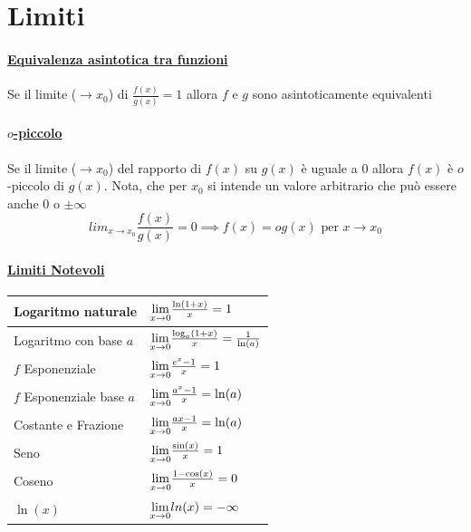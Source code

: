 \documentclass[12pt, a4paper]{article}
\begin{document}
\section*{Limiti}



\paragraph*{\underline{Equivalenza asintotica tra funzioni}} Se il limite ($\to x_0$) di $\frac{f(x)}{g(x)} = 1$ allora $f$ e $g$ sono asintoticamente equivalenti

\paragraph*{\underline{$o$-piccolo}} Se il limite ($\to x_0$) del rapporto di $f(x)$ su $g(x)$ è uguale a $0$ allora $f(x)$ è $o$-piccolo di $g(x)$.
Nota, che per $x_0$ si intende un valore arbitrario che può essere anche 0 o $\pm \infty$
$$lim_{x\to x_0} \frac{f(x)}{g(x)} = 0 \implies f(x) = o g(x)\text{ per } x\to x_0 $$

\paragraph*{\underline{Limiti Notevoli}}
\begin{tabularx}{0.8\textwidth}{ |X|X| }
	\hline
	Logaritmo naturale        & $\underset{x \to 0}{\lim} \frac{\ln(1+x)}{x} = 1 $                   \\
	\hline
	Logaritmo con base $a$    & $\underset{x \to 0}{\lim} \frac{\log_a(1+x)}{x} = \frac{1}{\ln(a)} $ \\
	\hline
	$f$ Esponenziale          & $\underset{x \to 0}{\lim} \frac{e^x-1}{x} = 1$                       \\
	\hline
	$f$ Esponenziale base $a$ & $\underset{x \to 0}{\lim} \frac{a^x-1}{x} = \ln(a)$                  \\
	\hline
	Costante e Frazione       & $\underset{x \to 0}{\lim}\frac{ax -1}{x} = \ln(a)$                   \\
	\hline
	Seno                      & $\underset{x \to 0}{\lim}\frac{\sin(x)}{x} = 1$                      \\
	\hline
	Coseno                    & $\underset{x \to 0}{\lim} \frac{1-\cos(x)}{x} = 0 $                  \\
	\hline
	\hline
	$\ln(x)$                  & $\underset{x \to 0}{\lim} ln(x) = -\infty $\\ %
	\hline
\end{tabularx}
\end{document}
